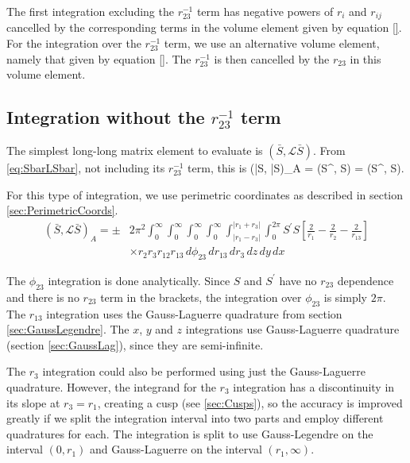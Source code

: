 \documentclass[Dissertation.tex]{subfiles}
\begin{document}
The first integration excluding the $r_{23}^{-1}$ term has negative powers of $r_i$ and $r_{ij}$ cancelled by the corresponding terms in the volume element given by equation \ref{}.  For the integration over the $r_{23}^{-1}$ term, we use an alternative volume element, namely that given by equation \ref{}.  The $r_{23}^{-1}$ is then cancelled by the $r_{23}$ in this volume element.


\subsection{Integration without the \texorpdfstring{$r_{23}^{-1}$} {1/r23} term}
\label{sec:LongLongNoR23}
The simplest long-long matrix element to evaluate is $(\bar{S},\mathcal{L} \bar{S})$.  From \cref{eq:SbarLSbar}, not including its $r_{23}^{-1}$ term, this is
\beq
(\bar{S}, \bar{S})_A = \pm \left(S^\prime, S\right) = \pm \left(S^\prime,  S\right).
\eeq

For this type of integration, we use perimetric coordinates as described in section \ref{sec:PerimetricCoords}.
\begin{align}
\label{eq:SBarSBarInt}
(\bar{S},\mathcal{L} \bar{S})_A = \pm &2\pi^2 \int_0^\infty \int_0^\infty \int_0^\infty \int_0^\infty \int_{|r_1 - r_3|}^{|r_1 + r_3|} \int_0^{2\pi}  S^\prime S \left[ \frac{2}{r_1} - \frac{2}{r_2} - \frac{2}{r_{13}}\right] \\
&\times r_2 r_3 r_{12} r_{13}\, d\phi_{23}\, dr_{13}\, dr_3\, dz\, dy\, dx
\end{align}

The $\phi_{23}$ integration is done analytically. Since $S$ and $S^\prime$ have no $r_{23}$ dependence and there is no $r_{23}$ term in the brackets, the integration over $\phi_{23}$ is simply $2\pi$.  The $r_{13}$ integration uses the Gauss-Laguerre quadrature from section \ref{sec:GaussLegendre}. The $x$, $y$ and $z$ integrations use Gauss-Laguerre quadrature (section \ref{sec:GaussLag}), since they are semi-infinite.

The $r_3$ integration could also be performed using just the Gauss-Laguerre 
quadrature. However, the integrand for the $r_3$ integration has a 
discontinuity in its slope at $r_3=r_1$, creating a cusp
(see \cref{sec:Cusps}), so the accuracy is improved greatly if we split the
integration interval into two parts and employ different quadratures for each.
The integration is split to use Gauss-Legendre on the interval $(0,r_1)$ and
Gauss-Laguerre on the interval $(r_1,\infty)$.
\end{document}

